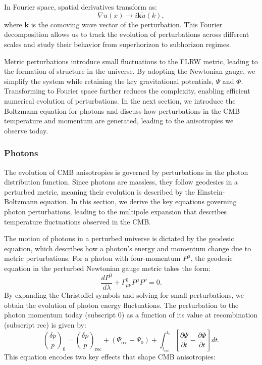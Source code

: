 \documentclass{aa}
\begin{document}
In Fourier space, spatial derivatives transform as:  
\begin{equation}
\nabla u(x) \rightarrow i \mathbf{k} \tilde{u}(k),
\end{equation}
where $\mathbf{k}$ is the comoving wave vector of the perturbation. This Fourier decomposition allows us to track the evolution of perturbations across different scales and study their behavior from superhorizon to subhorizon regimes.

Metric perturbations introduce small fluctuations to the FLRW metric, leading to the formation of structure in the universe. By adopting the Newtonian gauge, we simplify the system while retaining the key gravitational potentials, $\Psi$ and $\Phi$. Transforming to Fourier space further reduces the complexity, enabling efficient numerical evolution of perturbations. In the next section, we introduce the Boltzmann equation for photons and discuss how perturbations in the CMB temperature and momentum are generated, leading to the anisotropies we observe today.
\color{black}






\subsubsection{Photons}
\color{Plum}
The evolution of CMB anisotropies is governed by perturbations in the photon distribution function. Since photons are massless, they follow geodesics in a perturbed metric, meaning their evolution is described by the Einstein-Boltzmann equation. In this section, we derive the key equations governing photon perturbations, leading to the multipole expansion that describes temperature fluctuations observed in the CMB.  

The motion of photons in a perturbed universe is dictated by the geodesic equation, which describes how a photon's energy and momentum change due to metric perturbations. For a photon with four-momentum $P^\mu$, the geodesic equation in the perturbed Newtonian gauge metric takes the form:
\begin{equation}
\frac{dP^0}{d\lambda} + \Gamma^0_{\mu\nu} P^\mu P^\nu = 0.
\end{equation}
By expanding the Christoffel symbols and solving for small perturbations, we obtain the evolution of photon energy fluctuations. The perturbation to the photon momentum today (subscript 0) as a function of its value at recombination (subscript rec) is given by:
\begin{equation}
\left(\frac{\delta p}{p}\right)_0 = \left(\frac{\delta p}{p}\right)_{\text{rec}} + \left(\Psi_{\text{rec}} - \Psi_0\right) + \int_{t_{\text{rec}}}^{t_0} \left[\frac{\partial\Psi}{\partial t} - \frac{\partial \Phi}{\partial t} \right] dt.
\end{equation}
This equation encodes two key effects that shape CMB anisotropies:
\end{document}
